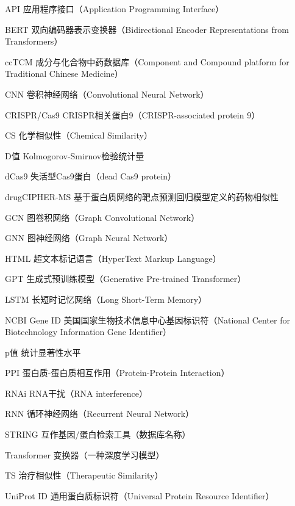 
\begin{denotation}[3cm]
  \item[API]{应用程序接口（Application Programming Interface）}
  \item[BERT]{双向编码器表示变换器（Bidirectional Encoder Representations from Transformers）}
  \item[ccTCM]{成分与化合物中药数据库（Component and Compound platform for Traditional Chinese Medicine）}
  \item[CNN]{卷积神经网络（Convolutional Neural Network）}
  \item[CRISPR/Cas9]{CRISPR相关蛋白9（CRISPR-associated protein 9）}
  \item[CS]{化学相似性（Chemical Similarity）}
  \item[D值]{Kolmogorov-Smirnov检验统计量}
  \item[dCas9]{失活型Cas9蛋白（dead Cas9 protein）}
  \item[drugCIPHER-MS]{基于蛋白质网络的靶点预测回归模型定义的药物相似性}
  \item[GCN]{图卷积网络（Graph Convolutional Network）}
  \item[GNN]{图神经网络（Graph Neural Network）}
  \item[HTML]{超文本标记语言（HyperText Markup Language）}
  \item[GPT]{生成式预训练模型（Generative Pre-trained Transformer）}
  \item[LSTM]{长短时记忆网络（Long Short-Term Memory）}
  \item[NCBI Gene ID]{美国国家生物技术信息中心基因标识符（National Center for Biotechnology Information Gene Identifier）}
  \item[p值]{统计显著性水平}
  \item[PPI]{蛋白质-蛋白质相互作用（Protein-Protein Interaction）}
  \item[RNAi]{RNA干扰（RNA interference）}
  \item[RNN]{循环神经网络（Recurrent Neural Network）}
  \item[STRING]{互作基因/蛋白检索工具（数据库名称）}
  \item[Transformer]{变换器（一种深度学习模型）}
  \item[TS]{治疗相似性（Therapeutic Similarity）}
  \item[UniProt ID]{通用蛋白质标识符（Universal Protein Resource Identifier）}
\end{denotation}



